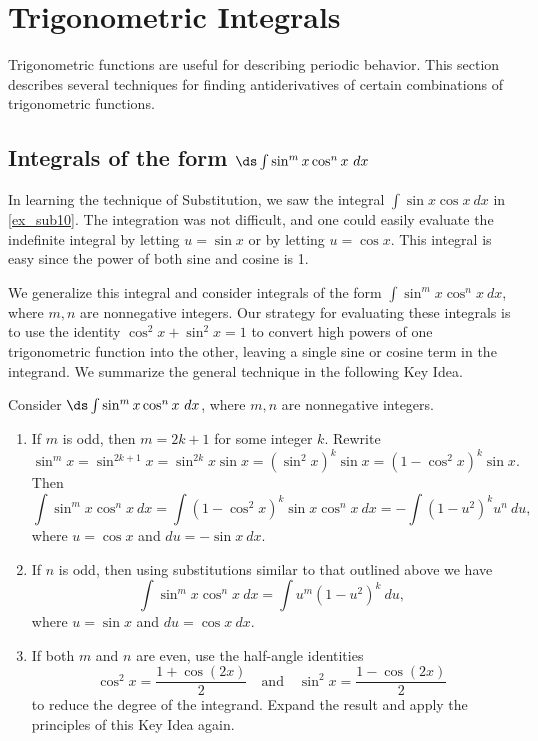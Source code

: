 

\section{Trigonometric Integrals}\label{sec:trigint}

Trigonometric functions are useful for describing periodic behavior. This section describes several techniques for finding antiderivatives of certain combinations of trigonometric functions.

\subsection{\texorpdfstring{Integrals of the form $\ds \int \sin^m x\cos^n x\ dx$}{Integrands of the form (sin x)\^{}m (cos x)\^{}n}}

In learning the technique of Substitution, we saw the integral $\int \sin x\cos x\ dx$ in \autoref{ex_sub10}. The integration was not difficult, and one could easily evaluate the indefinite integral by letting $u=\sin x$ or by letting $u = \cos x$. This integral is easy since the power of both sine and cosine is 1.

We generalize this integral and consider integrals of the form $\int \sin^mx\cos^nx\ dx$, where $m,n$ are nonnegative integers. Our strategy for evaluating these integrals is to use the identity $\cos^2x+\sin^2x=1$ to convert high powers of one trigonometric function into the other, leaving a single sine or cosine term in the integrand. We summarize the general technique in the following Key Idea.


\setboxwidth{60pt}
{Consider $\ds \int \sin^mx\cos^nx\ dx$, where $m,n$ are nonnegative integers.
\begin{enumerate}
	\item	If $m$ is odd, then $m=2k+1$ for some integer $k$. Rewrite \small
		\[
		\sin^mx = \sin^{2k+1}x = \sin^{2k}x\sin x = (\sin^2x)^k\sin x = (1-\cos^2x)^k\sin x.
		\]
		\normalsize Then \small
		\[
		\int \sin^mx\cos^nx\ dx = \int (1-\cos^2x)^k\sin x\cos^nx\ dx = -\int (1-u^2)^ku^n\ du,
		\]
		\normalsize where $u = \cos x$ and $du = -\sin x\ dx$. 
	\item	If $n$ is odd, then using substitutions similar to that outlined above we have \small
		\[\int \sin^mx\cos^nx\ dx = \int u^m(1-u^2)^k\ du,\]
		\normalsize where $u = \sin x$ and $du = \cos x\ dx$.
	\item	If both $m$ and $n$ are even, use the half-angle identities \small
		\[
		\cos^2x = \frac{1+\cos (2x)}{2} \quad \text{and}\quad \sin^2x = \frac{1-\cos(2x)}2
		\]
		\normalsize to reduce the degree of the integrand. Expand the result and apply the principles of this Key Idea again.
	\end{enumerate}}

